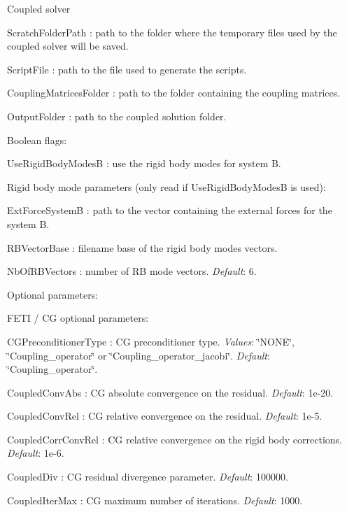 Coupled solver
\begin{DoxyItemize}
\item {\ttfamily Scratch\+Folder\+Path} \+: path to the folder where the temporary files used by the coupled solver will be saved.
\item {\ttfamily Script\+File} \+: path to the file used to generate the scripts.
\item {\ttfamily Coupling\+Matrices\+Folder} \+: path to the folder containing the coupling matrices.
\item {\ttfamily Output\+Folder} \+: path to the coupled solution folder.
\end{DoxyItemize}

Boolean flags\+:
\begin{DoxyItemize}
\item {\ttfamily Use\+Rigid\+Body\+Modes\+B} \+: use the rigid body modes for system B.
\end{DoxyItemize}

Rigid body mode parameters (only read if {\ttfamily Use\+Rigid\+Body\+Modes\+B} is used)\+:
\begin{DoxyItemize}
\item {\ttfamily Ext\+Force\+System\+B} \+: path to the vector containing the external forces for the system B.
\item {\ttfamily R\+B\+Vector\+Base} \+: filename base of the rigid body modes vectors.
\item {\ttfamily Nb\+Of\+R\+B\+Vectors} \+: number of R\+B mode vectors. {\itshape Default}\+: 6.
\end{DoxyItemize}

Optional parameters\+:
\begin{DoxyItemize}
\item F\+E\+T\+I / C\+G optional parameters\+:
\begin{DoxyItemize}
\item {\ttfamily C\+G\+Preconditioner\+Type} \+: C\+G preconditioner type. {\itshape Values}\+: \char`\"{}\+N\+O\+N\+E\char`\"{}, \char`\"{}\+Coupling\+\_\+operator\char`\"{} or \char`\"{}\+Coupling\+\_\+operator\+\_\+jacobi\char`\"{}. {\itshape Default}\+: \char`\"{}\+Coupling\+\_\+operator\char`\"{}.
\item {\ttfamily Coupled\+Conv\+Abs} \+: C\+G absolute convergence on the residual. {\itshape Default}\+: 1e-\/20.
\item {\ttfamily Coupled\+Conv\+Rel} \+: C\+G relative convergence on the residual. {\itshape Default}\+: 1e-\/5.
\item {\ttfamily Coupled\+Corr\+Conv\+Rel} \+: C\+G relative convergence on the rigid body corrections. {\itshape Default}\+: 1e-\/6.
\item {\ttfamily Coupled\+Div} \+: C\+G residual divergence parameter. {\itshape Default}\+: 100000.
\item {\ttfamily Coupled\+Iter\+Max} \+: C\+G maximum number of iterations. {\itshape Default}\+: 1000. 
\end{DoxyItemize}
\end{DoxyItemize}

